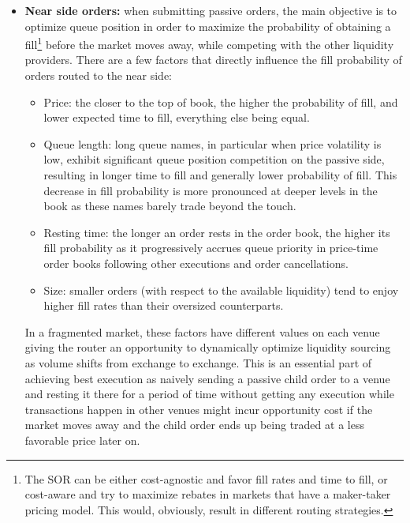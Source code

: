 \begin{itemize}
\item \textbf{Near side orders:} when submitting passive orders, the main objective is to optimize queue position in order to maximize the probability of obtaining a fill\footnote{The SOR can be either cost-agnostic and favor fill rates and time to fill, or cost-aware and try to maximize rebates in markets that have a maker-taker pricing model. This would, obviously, result in different routing strategies.} before the market moves away, while competing with the other liquidity providers. There are a few factors that directly influence the fill probability of orders routed to the near side:


\begin{itemize}
\item Price: the closer to the top of book, the higher the probability of fill, and lower expected time to fill, everything else being equal.

\item Queue length: long queue names, in particular when price volatility is low, exhibit significant queue position competition on the passive side, resulting in longer time to fill and generally lower probability of fill. This decrease in fill probability is more pronounced at deeper levels in the book as these names barely trade beyond the touch. 

\item Resting time: the longer an order rests in the order book, the higher its fill probability as it progressively accrues queue priority in price-time order books following other executions and order cancellations.

\item Size: smaller orders (with respect to the available liquidity) tend to enjoy higher fill rates than their oversized counterparts.
\end{itemize}


In a fragmented market, these factors have different values on each venue giving the router an opportunity to dynamically optimize liquidity sourcing as volume shifts from exchange to exchange. This is an essential part of achieving best execution as naively  sending a passive child order to a venue and resting it there for a period of time without getting any execution while transactions happen in other venues might incur opportunity cost if the market moves away and the child order ends up being traded at a less favorable price later on. \twomedskip



\end{itemize}
